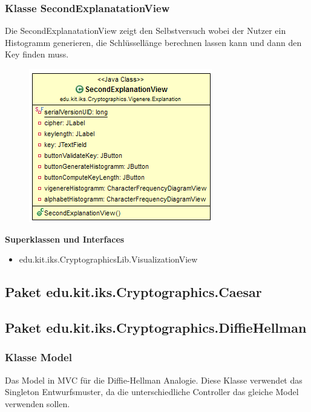 \documentclass{article}
\begin{document}
    \subsubsection{Klasse SecondExplanatationView}
      Die SecondExplanatationView zeigt den Selbstversuch wobei der Nutzer ein Histogramm generieren, die Schlüssellänge berechnen lassen kann und dann den Key finden muss.
      \begin{figure}[H]
        \centering
        \includegraphics{resources/edu-kit-iks-Cryptographics-Vigenere-SecondExplanationView}
      \end{figure}

      \textbf{Superklassen und Interfaces}
      \begin{itemize}
        \item edu.kit.iks.CryptographicsLib.VisualizationView
      \end{itemize}

\subsection{Paket edu.kit.iks.Cryptographics.Caesar}

\subsection{Paket edu.kit.iks.Cryptographics.DiffieHellman}
\subsubsection{Klasse Model}
      Das Model in MVC für die Diffie-Hellman Analogie.
      Diese Klasse verwendet das Singleton Entwurfsmuster,
      da die unterschiedliche Controller das gleiche Model verwenden sollen.
\end{document}
